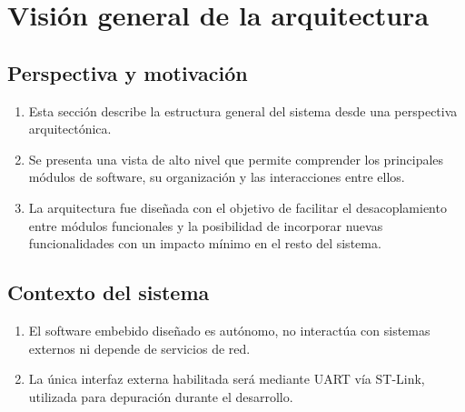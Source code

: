 \documentclass[11pt,a4paper]{article}
\begin{document}
\section{Visión general de la arquitectura}

\subsection{Perspectiva y motivación}
\begin{enumerate}
  \item Esta sección describe la estructura general del sistema \textit{\ttitle} desde una perspectiva arquitectónica. 
  \item Se presenta una vista de alto nivel que permite comprender los principales módulos de software, su organización y las interacciones entre ellos.
  \item La arquitectura fue diseñada con el objetivo de facilitar el desacoplamiento entre módulos funcionales y la posibilidad de incorporar nuevas funcionalidades con un impacto mínimo en el resto del sistema.
\end{enumerate}

\subsection{Contexto del sistema}
\begin{enumerate}
  \item El software embebido diseñado es autónomo, no interactúa con sistemas externos ni depende de servicios de red.
  \item La única interfaz externa habilitada será mediante UART vía ST-Link, utilizada para depuración durante el desarrollo.
\end{enumerate}
\end{document}
